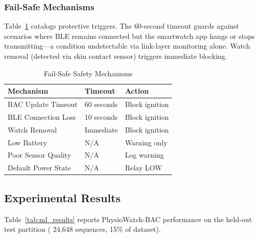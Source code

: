 \documentclass[HARVARD,Times2COL]{WileyNJDv5} %
\providecommand{\DIFadd}[1]{{\protect\color{red} #1}} %
\providecommand{\DIFdel}[1]{} %
\providecommand{\DIFaddbegin}{} %
\providecommand{\DIFaddend}{} %
\providecommand{\DIFdelbegin}{} %
\providecommand{\DIFdelend}{} %
\providecommand{\DIFscaledelfig}{0.5}
\newlength{\DIFdelgraphicswidth} %
\newlength{\DIFdelgraphicsheight} %
\providecommand{\DIFaddincludegraphics}[2][]{{\color{blue}\fbox{\DIFOincludegraphics[#1]{#2}}}} %
\providecommand{\DIFdelincludegraphics}[2][]{%
\sbox{\DIFdelgraphicsbox}{\DIFOincludegraphics[#1]{#2}}%
\settoboxwidth{\DIFdelgraphicswidth}{\DIFdelgraphicsbox} %
\settoboxtotalheight{\DIFdelgraphicsheight}{\DIFdelgraphicsbox} %
\scalebox{\DIFscaledelfig}{%
\parbox[b]{\DIFdelgraphicswidth}{\usebox{\DIFdelgraphicsbox}\\[-\baselineskip] \rule{\DIFdelgraphicswidth}{0em}}\llap{\resizebox{\DIFdelgraphicswidth}{\DIFdelgraphicsheight}{%
\setlength{\unitlength}{\DIFdelgraphicswidth}%
\begin{picture}(1,1)%
\thicklines\linethickness{2pt} %
{\color[rgb]{1,0,0}\put(0,0){\framebox(1,1){}}}%
{\color[rgb]{1,0,0}\put(0,0){\line( 1,1){1}}}%
{\color[rgb]{1,0,0}\put(0,1){\line(1,-1){1}}}%
\end{picture}%
}\hspace*{3pt}}} %
} %
\DeclareRobustCommand{\DIFaddbegin}{\DIFOaddbegin \let\includegraphics\DIFaddincludegraphics} %
\DeclareRobustCommand{\DIFaddend}{\DIFOaddend \let\includegraphics\DIFOincludegraphics} %
\DeclareRobustCommand{\DIFdelbegin}{\DIFOdelbegin \let\includegraphics\DIFdelincludegraphics} %
\DeclareRobustCommand{\DIFdelend}{\DIFOaddend \let\includegraphics\DIFOincludegraphics} %
\begin{document}
\subsubsection{Fail-Safe Mechanisms}
Table~\ref{tab:failsafes} catalogs protective triggers. The 60-second timeout guards against scenarios where BLE remains connected but the smartwatch app hangs or stops transmitting---a condition undetectable via link-layer monitoring alone. Watch removal (detected via skin contact sensor) triggers immediate blocking.

\begin{table}[htbp]
\caption{Fail-Safe Safety Mechanisms}
\label{tab:failsafes}
\centering
\small
\begin{tabular}{@{}lll@{}}
\toprule
\textbf{Mechanism} & \textbf{Timeout} & \textbf{Action} \\
\midrule
BAC Update Timeout & 60 seconds & Block ignition \\
BLE Connection Loss & 10 seconds & Block ignition \\
Watch Removal & Immediate & Block ignition \\
Low Battery & N/A & Warning only \\
Poor Sensor Quality & N/A & Log warning \\
Default Power State & N/A & Relay LOW \\
\bottomrule
\end{tabular}
\end{table}
\subsection{Experimental Results}
Table~\ref{tab:ml_results} reports PhysioWatch-BAC performance on the held-out test partition (\DIFdelbegin \DIFdel{2,250 }\DIFdelend \DIFaddbegin \DIFadd{24,648 }\DIFaddend sequences, 15\% of dataset).
\end{document}

